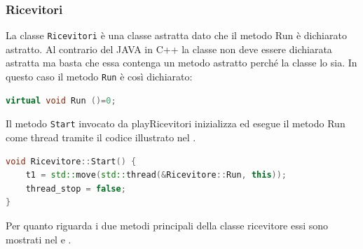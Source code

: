 \subsubsection{Ricevitori}
La classe \texttt{Ricevitori} è una classe astratta dato che il metodo Run è dichiarato astratto. Al contrario del JAVA in C++ la classe non deve essere dichiarata astratta ma basta che essa contenga un metodo astratto perché la classe lo sia. In questo caso il metodo \texttt{Run} è così dichiarato:
\begin{lstlisting}[language=C++,caption=Metodo astratto Run]
virtual void Run ()=0;
\end{lstlisting}
Il metodo \texttt{Start} invocato da playRicevitori inizializza ed esegue il metodo Run come thread tramite il codice illustrato nel .
\begin{lstlisting}[language=C++,caption=Metodo Start,label=lst:start]
void Ricevitore::Start() {
    t1 = std::move(std::thread(&Ricevitore::Run, this));
    thread_stop = false;
}
\end{lstlisting}
Per quanto riguarda i due metodi principali della classe ricevitore essi sono mostrati nel  e . 
